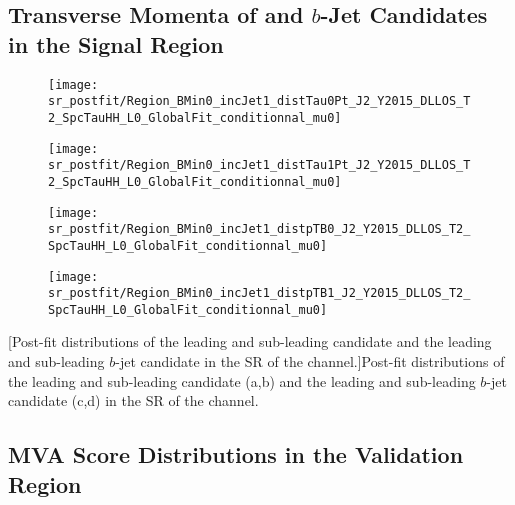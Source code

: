 \subsection*{Transverse Momenta of \tauhadvis and $b$-Jet Candidates in the
  Signal Region}

{
  \centering

  \null\vfill


  \begin{subfigure}{0.495\textwidth}
    \centering

    \texttt{[image: sr\_postfit/Region\_BMin0\_incJet1\_distTau0Pt\_J2\_Y2015\_DLLOS\_T2\_SpcTauHH\_L0\_GlobalFit\_conditionnal\_mu0]}
    \subcaption{}
  \end{subfigure}\hfill%
  \begin{subfigure}{0.495\textwidth}
    \centering

    \texttt{[image: sr\_postfit/Region\_BMin0\_incJet1\_distTau1Pt\_J2\_Y2015\_DLLOS\_T2\_SpcTauHH\_L0\_GlobalFit\_conditionnal\_mu0]}
    \subcaption{}
  \end{subfigure}

  \begin{subfigure}{0.495\textwidth}
    \centering

    \texttt{[image: sr\_postfit/Region\_BMin0\_incJet1\_distpTB0\_J2\_Y2015\_DLLOS\_T2\_SpcTauHH\_L0\_GlobalFit\_conditionnal\_mu0]}
    \subcaption{}
  \end{subfigure}\hfill%
  \begin{subfigure}{0.495\textwidth}
    \centering

    \texttt{[image: sr\_postfit/Region\_BMin0\_incJet1\_distpTB1\_J2\_Y2015\_DLLOS\_T2\_SpcTauHH\_L0\_GlobalFit\_conditionnal\_mu0]}
    \subcaption{}
  \end{subfigure}

  [Post-fit distributions of the leading and sub-leading
  \tauhadvis candidate \pT and the leading and sub-leading $b$-jet candidate \pT
  in the SR of the \hadhad channel.]{Post-fit distributions of the leading and
    sub-leading \tauhadvis candidate \pT (a,b) and the leading and sub-leading
    $b$-jet candidate \pT (c,d) in the SR of the \hadhad channel.}

  \null\vfill
}


\subsection*{MVA Score Distributions in the \ZJets Validation Region}


